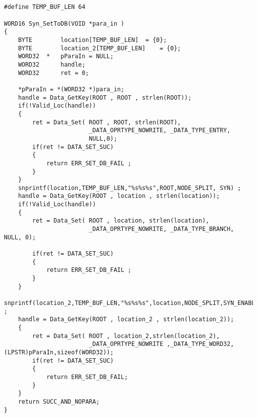 ﻿\documentclass  [11pt,twocolumn]{article}
\begin{document}
\subsection{}
\begin{lstlisting}
#define TEMP_BUF_LEN 64

WORD16 Syn_SetToDB(VOID *para_in )
{
	BYTE		location[TEMP_BUF_LEN]	= {0};
	BYTE		location_2[TEMP_BUF_LEN]	= {0};
	WORD32 	*	pParaIn = NULL;
	WORD32 		handle;
	WORD32 		ret = 0;
	
	*pParaIn = *(WORD32 *)para_in;
	handle = Data_GetKey(ROOT , ROOT , strlen(ROOT));            
    if(!Valid_Loc(handle))
    { 
	    ret = Data_Set( ROOT , ROOT, strlen(ROOT),
                        _DATA_OPRTYPE_NOWRITE, _DATA_TYPE_ENTRY,
                        NULL,0);
	    if(ret != DATA_SET_SUC)
        {
            return ERR_SET_DB_FAIL ;
        }
    }
	snprintf(location,TEMP_BUF_LEN,"%s%s%s",ROOT,NODE_SPLIT, SYN) ;
	handle = Data_GetKey(ROOT , location , strlen(location));            
    if(!Valid_Loc(handle))
    { 
	    ret = Data_Set( ROOT , location, strlen(location),
                        _DATA_OPRTYPE_NOWRITE, _DATA_TYPE_BRANCH, NULL, 0);

	    if(ret != DATA_SET_SUC)
        {
            return ERR_SET_DB_FAIL ;
        }
    }    
	snprintf(location_2,TEMP_BUF_LEN,"%s%s%s",location,NODE_SPLIT,SYN_ENABLE) ;
	handle = Data_GetKey(ROOT , location_2 , strlen(location_2));            
    {
	    ret = Data_Set( ROOT , location_2,strlen(location_2),
                        _DATA_OPRTYPE_NOWRITE ,_DATA_TYPE_WORD32,(LPSTR)pParaIn,sizeof(WORD32)); 
	    if(ret != DATA_SET_SUC)
        {
            return ERR_SET_DB_FAIL;
        }
    }
	return SUCC_AND_NOPARA;
}
\end{lstlisting}
\end{document}
